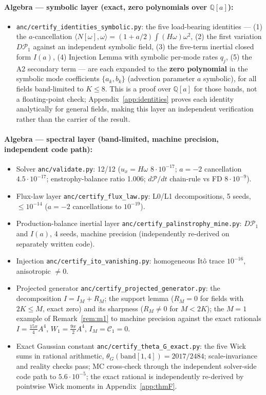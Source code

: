 \documentclass[11pt]{article}
\theoremstyle{remark}
\theoremstyle{plain}
\begin{document}
\paragraph{Algebra --- symbolic layer (exact, zero polynomials over $\mathbb{Q}[a]$):}
\begin{itemize}
\item \texttt{anc/certify\_identities\_symbolic.py}:
  the five load-bearing identities --- (1) the $a$-cancellation $\langle N[\omega],\omega\rangle =
  (1+a/2)\int(H\omega)\omega^2$, (2) the first variation $D\mathcal{P}_1$ against an
  independent symbolic field, (3) the five-term inertial closed form $I(a)$,
  (4) Injection Lemma with symbolic per-mode rates $q_j$, (5) the A2 secondary term ---
  are each expanded to the \textbf{zero polynomial} in the symbolic mode
  coefficients $\{a_k, b_k\}$ (advection parameter $a$ symbolic), for all fields
  band-limited to $K \le 8$. This is a proof over $\mathbb{Q}[a]$ for those bands,
  not a floating-point check; Appendix~\ref{app:identities} proves each identity
  analytically for general fields, making this layer an independent verification
  rather than the carrier of the result.
\end{itemize}

\paragraph{Algebra --- spectral layer (band-limited, machine precision, independent code path):}
\begin{itemize}
\item Solver \texttt{anc/validate.py}: 12/12 ($u_x=H\omega$ $8\cdot10^{-17}$; $a=-2$ cancellation
  $4.5\cdot10^{-17}$; enstrophy-balance ratio 1.006; $d\mathcal{P}/dt$ chain-rule vs FD $8\cdot10^{-9}$).
\item Flux-law layer \texttt{anc/certify\_flux\_law.py}: L0/L1 decompositions, 5 seeds, $\le10^{-14}$
  ($a=-2$ cancellations to $10^{-19}$).
\item Production-balance inertial layer \texttt{anc/certify\_palinstrophy\_mine.py}: $D\mathcal{P}_1$ and $I(a)$, 4 seeds,
  machine precision (independently re-derived on separately written code).
\item Injection \texttt{anc/certify\_ito\_vanishing.py}: homogeneous It\^o trace $10^{-16}$,
  anisotropic $\ne0$.
\item Projected generator \texttt{anc/certify\_projected\_generator.py}: the decomposition
  $I = I_M + R_M$; the support lemma ($R_M = 0$ for fields with $2K \le M$, exact zero) and its
  sharpness ($R_M \ne 0$ for $M < 2K$); the $M{=}1$ example of Remark~\ref{rem:m1} to machine
  precision against the exact rationals $I = \tfrac{15\pi}{4}A^4$, $W_1 = \tfrac{9\pi}{2}A^4$,
  $I_M = \mathcal{C}_1 = 0$.
\item Exact Gaussian constant \texttt{anc/certify\_theta\_G\_exact.py}: the five
  Wick sums in rational arithmetic, $\theta_G(\text{band}[1,4]) = 2017/2484$;
  scale-invariance and reality checks pass; MC cross-check through the independent
  solver-side code path to $5.6\cdot10^{-5}$; the exact rational is independently
  re-derived by pointwise Wick moments in Appendix~\ref{app:thmF}.
\end{itemize}
\end{document}
